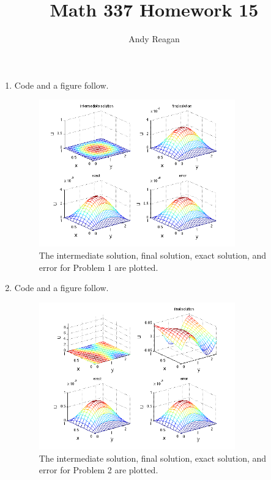 \documentclass[11pt]{article}
\author{Andy Reagan}
\title{Math 337 Homework 15}
\begin{document}
\maketitle

\begin{enumerate}

\item Code and a figure follow.



\begin{figure}[h!]
  \centering
    \includegraphics[width=0.8\textwidth]{andy_hw15_prb01_all.png}
    \caption{The intermediate solution, final solution, exact solution, and error for Problem 1 are plotted.}
\end{figure}

\item Code and a figure follow.



\begin{figure}[h!]
  \centering
    \includegraphics[width=0.8\textwidth]{andy_hw15_prb02_all.png}
    \caption{The intermediate solution, final solution, exact solution, and error for Problem 2 are plotted.}
\end{figure}


\end{enumerate}
\end{document}
